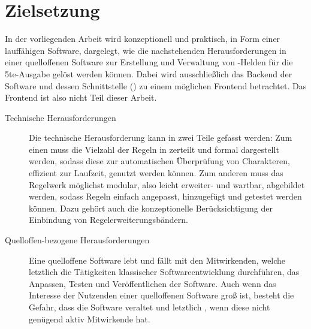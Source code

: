 \section{Zielsetzung}\label{sec:zielsetzung}

In der vorliegenden Arbeit wird konzeptionell und praktisch, in Form einer lauffähigen Software, dargelegt, wie die nachstehenden Herausforderungen in einer quelloffenen Software zur Erstellung und Verwaltung von -Helden für die 5te-Ausgabe gelöst werden können.
Dabei wird ausschließlich das Backend der Software und dessen Schnittstelle () zu einem möglichen Frontend betrachtet.
Das Frontend ist also nicht Teil dieser Arbeit.

\begin{description}
    \item[Technische Herausforderungen] Die technische Herausforderung kann in zwei Teile gefasst werden:
    Zum einen muss die Vielzahl der Regeln in  zerteilt und formal dargestellt werden, sodass diese zur automatischen Überprüfung von Charakteren, effizient zur Laufzeit, genutzt werden können.
    Zum anderen muss das Regelwerk möglichst modular, also leicht erweiter- und wartbar, abgebildet werden, sodass Regeln einfach angepasst, hinzugefügt und getestet werden können.
    Dazu gehört auch die konzeptionelle Berücksichtigung der Einbindung von Regelerweiterungsbändern.

    \item[Quelloffen-bezogene Herausforderungen] Eine quelloffene Software lebt und fällt mit den \sog Mitwirkenden, welche letztlich die Tätigkeiten klassischer Softwareentwicklung durchführen, \zB das Anpassen, Testen und Veröffentlichen der Software.
    Auch wenn das Interesse der Nutzenden einer quelloffenen Software groß ist, besteht die Gefahr, dass die Software veraltet und letztlich , wenn diese nicht genügend aktiv Mitwirkende hat.
\end{description}

